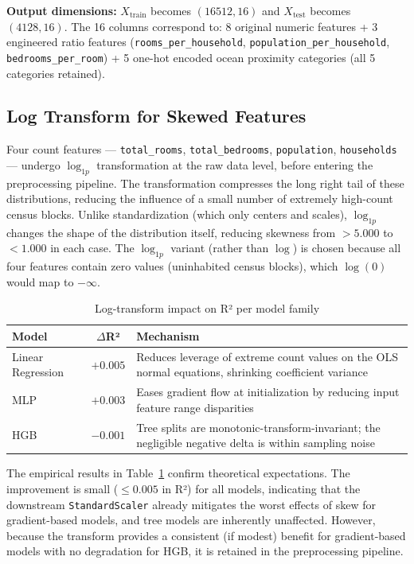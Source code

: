 \textbf{Output dimensions:} $X_{\text{train}}$ becomes $(16512, 16)$ and $X_{\text{test}}$ becomes $(4128, 16)$. The 16 columns correspond to: 8 original numeric features + 3 engineered ratio features (\texttt{rooms\_per\_household}, \texttt{population\_per\_household}, \texttt{bedrooms\_per\_room}) + 5 one-hot encoded ocean proximity categories (all 5 categories retained).

\subsection{Log Transform for Skewed Features}

Four count features — \texttt{total\_rooms}, \texttt{total\_bedrooms}, \texttt{population}, \texttt{households} — undergo $\log_{1p}$ transformation at the raw data level, before entering the preprocessing pipeline. The transformation compresses the long right tail of these distributions, reducing the influence of a small number of extremely high-count census blocks. Unlike standardization (which only centers and scales), $\log_{1p}$ changes the shape of the distribution itself, reducing skewness from $> 5.000$ to $< 1.000$ in each case. The $\log_{1p}$ variant (rather than $\log$) is chosen because all four features contain zero values (uninhabited census blocks), which $\log(0)$ would map to $-\infty$.

\begin{table}[H]
\centering{}
\begin{tabular}{l c p{5.5cm}}
\toprule\rowcolor{tablehead!80}\color{white}\textbf{Model} &\color{white}\textbf{$\Delta$R²} &\color{white}\textbf{Mechanism}\\
\midrule
Linear Regression & $+0.005$ & Reduces leverage of extreme count values on the OLS normal equations, shrinking coefficient variance\\
MLP               & $+0.003$ & Eases gradient flow at initialization by reducing input feature range disparities\\
HGB               & $-0.001$ & Tree splits are monotonic-transform-invariant; the negligible negative delta is within sampling noise\\
\bottomrule
\end{tabular}
\caption{Log-transform impact on R² per model family}
\label{tab:log-impact}
\end{table}

The empirical results in Table~\ref{tab:log-impact} confirm theoretical expectations. The improvement is small ($\leq 0.005$ in R²) for all models, indicating that the downstream \texttt{StandardScaler} already mitigates the worst effects of skew for gradient-based models, and tree models are inherently unaffected. However, because the transform provides a consistent (if modest) benefit for gradient-based models with no degradation for HGB, it is retained in the preprocessing pipeline.

